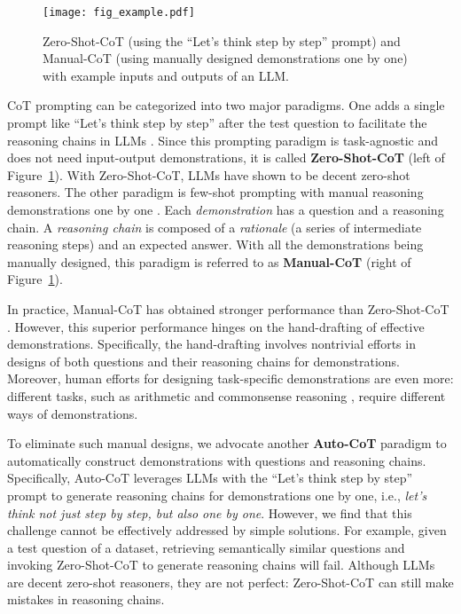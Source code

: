 \begin{figure}[htb]
\vspace{-3mm}
  \begin{center}
   \texttt{[image: fig\_example.pdf]}
  \end{center}
  \caption{Zero-Shot-CoT \citep{kojima2022large} (using the ``Let’s think step by step'' prompt) and Manual-CoT \citep{cot_wei} (using manually designed demonstrations one by one) with example inputs and outputs of an LLM.}
  \label{fig_examples}
\end{figure}

CoT prompting can be categorized into two major paradigms. One adds a single prompt like ``Let's think step by step'' after the test question to facilitate the reasoning chains in LLMs \citep{kojima2022large}. Since this prompting paradigm is task-agnostic and does not need input-output demonstrations, it is called \textbf{Zero-Shot-CoT} (left of Figure~\ref{fig_examples}). With Zero-Shot-CoT, LLMs have shown to be decent zero-shot reasoners. The other paradigm is few-shot prompting with  manual reasoning demonstrations one by one \citep{cot_wei}. Each \emph{demonstration} has a question and a reasoning chain. A \emph{reasoning chain} is composed of a \emph{rationale} (a series of intermediate reasoning steps) and an expected answer.
With all the demonstrations being manually designed, this paradigm is referred to as \textbf{Manual-CoT} (right of Figure~\ref{fig_examples}).

In practice, Manual-CoT has obtained stronger performance than Zero-Shot-CoT \citep{cot_wei,kojima2022large}. However, this superior performance hinges on the hand-drafting of effective demonstrations. Specifically, the hand-drafting involves nontrivial efforts in designs of both questions and their reasoning chains for demonstrations. Moreover, human efforts for designing task-specific demonstrations are even more: different tasks, such as arithmetic \citep{multiarith} and commonsense reasoning \citep{commonsenseqa}, require different ways of demonstrations. 

To eliminate such manual designs, we advocate another \textbf{Auto-CoT} paradigm to automatically construct demonstrations with questions and reasoning chains.
Specifically, Auto-CoT
leverages LLMs 
with the ``Let’s think step by step'' prompt
to generate reasoning chains for demonstrations one by one,
i.e., \emph{let's think not just step by step, but also one by one}.
However, we find that this challenge cannot be effectively addressed by simple solutions. For example, given a test question of a dataset, retrieving semantically similar questions and invoking Zero-Shot-CoT to generate reasoning chains will fail. Although LLMs are decent zero-shot reasoners, they are not perfect: Zero-Shot-CoT can still make mistakes in reasoning chains.

